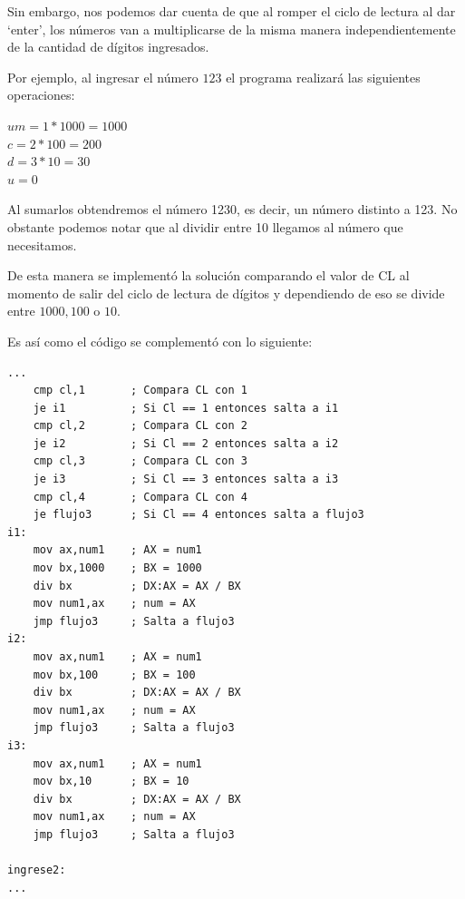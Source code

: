\documentclass[letter,12 pt,titlepage]{article}
\begin{document}
    Sin embargo, nos podemos dar cuenta de que al romper el ciclo de lectura al dar `enter', los números van a multiplicarse de la misma manera independientemente de la cantidad de dígitos ingresados. 

    Por ejemplo, al ingresar el número $123$ el programa realizará las siguientes operaciones:

    \begin{center}
    \begin{minipage}{0.3\linewidth}
        \begin{flushright}
        $um = 1 * 1000 = 1000$\\
        $ c = 2 *  100 =  200$\\
        $ d = 3 *   10 =   30$\\
        $ u = 0 $
        \end{flushright}
    \end{minipage}
    \end{center}

    Al sumarlos obtendremos el número 1230, es decir, un número distinto a 123. No obstante podemos notar que al dividir entre 10 llegamos al número que necesitamos.

    De esta manera se implementó la solución comparando el valor de CL al momento de salir del ciclo de lectura de dígitos y dependiendo de eso se divide entre $1000,100$ o $10$.

    Es así como el código se complementó con lo siguiente:

    \begin{verbatim}
...
    cmp cl,1       ; Compara CL con 1
    je i1          ; Si Cl == 1 entonces salta a i1
    cmp cl,2       ; Compara CL con 2
    je i2          ; Si Cl == 2 entonces salta a i2
    cmp cl,3       ; Compara CL con 3
    je i3          ; Si Cl == 3 entonces salta a i3
    cmp cl,4       ; Compara CL con 4
    je flujo3      ; Si Cl == 4 entonces salta a flujo3  
i1:
    mov ax,num1    ; AX = num1
    mov bx,1000    ; BX = 1000
    div bx         ; DX:AX = AX / BX
    mov num1,ax    ; num = AX
    jmp flujo3     ; Salta a flujo3  
i2:
    mov ax,num1    ; AX = num1
    mov bx,100     ; BX = 100
    div bx         ; DX:AX = AX / BX
    mov num1,ax    ; num = AX
    jmp flujo3     ; Salta a flujo3  
i3:
    mov ax,num1    ; AX = num1
    mov bx,10      ; BX = 10
    div bx         ; DX:AX = AX / BX
    mov num1,ax    ; num = AX
    jmp flujo3     ; Salta a flujo3  

ingrese2:
...
    \end{verbatim}
\end{document}

